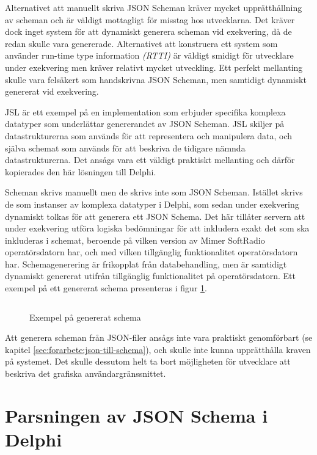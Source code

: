 Alternativet att manuellt skriva JSON Scheman kräver mycket upprätthållning av scheman och är väldigt mottagligt för misstag hos utvecklarna. Det kräver dock inget system för att dynamiskt generera scheman vid exekvering, då de redan skulle vara genererade. Alternativet att konstruera ett system som använder run-time type information \textit{(RTTI)} är väldigt smidigt för utvecklare under exekvering men kräver relativt mycket utveckling. Ett perfekt mellanting skulle vara felsäkert som handskrivna JSON Scheman, men samtidigt dynamiskt genererat vid exekvering.

JSL är ett exempel på en implementation som erbjuder specifika komplexa datatyper som underlättar genererandet av JSON Scheman. JSL skiljer på datastrukturerna som används för att representera och manipulera data, och själva schemat som används för att beskriva de tidigare nämnda datastrukturerna. \cite{Romanovich} Det ansågs vara ett väldigt praktiskt mellanting och därför kopierades den här lösningen till Delphi.

Scheman skrivs manuellt men de skrivs inte som JSON Scheman. Istället skrivs de som instanser av komplexa datatyper i Delphi, som sedan under exekvering dynamiskt tolkas för att generera ett JSON Schema. Det här tillåter servern att under exekvering utföra logiska bedömningar för att inkludera exakt det som ska inkluderas i schemat, beroende på vilken version av Mimer SoftRadio operatörsdatorn har, och med vilken tillgänglig funktionalitet operatörsdatorn har. Schemagenerering är frikopplat från databehandling, men är samtidigt dynamiskt genererat utifrån tillgänglig funktionalitet på operatörsdatorn. Ett exempel på ett genererat schema presenteras i figur \ref{fig:real-schema}.

\begin{figure}
	\inputminted[tabsize=2, frame=single, fontsize=\small, framesep=2mm, breaklines]{json}{code/schema.json}
	\vspace{-1.7em}
	\caption{Exempel på genererat schema}
	\label{fig:real-schema}
\end{figure}

Att generera scheman från JSON-filer ansågs inte vara praktiskt genomförbart (se kapitel \ref{sec:forarbete:json-till-schema}), och skulle inte kunna upprätthålla kraven på systemet. Det skulle dessutom helt ta bort möjligheten för utvecklare att beskriva det grafiska användargränssnittet.

\section{Parsningen av JSON Schema i Delphi}
\label{sec:arbetet:parsning}

